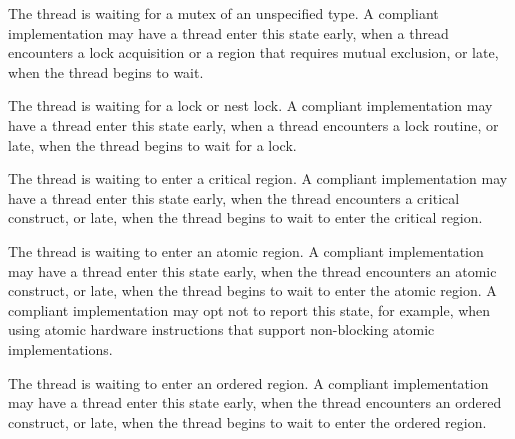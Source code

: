 \documentclass{article}
\newcommand{\descheader}[1]{{\needspace{3\baselineskip}\vspace{1em}\noindent \fbox{#1}}}
\begin{document}
\begin{description}

\item {}

  The thread is waiting for a mutex of an unspecified type. A compliant implementation
  may have a thread enter this state early, when a thread encounters a lock acquisition or a region that requires mutual exclusion, or late, when the thread begins to wait.

\item {}

  The thread is waiting for a  lock  or nest lock. A compliant implementation
  may have a thread enter this state early, when a thread
  encounters a lock  routine, or late, when the thread
  begins to wait for a lock.

\item {} 

  The thread is waiting to enter a critical region. A compliant
  implementation may have a thread enter this state early, when the
  thread encounters a critical construct, or late, when the thread
  begins to wait to enter the critical region. 


\item {} 

  The thread is waiting to enter an atomic region. A compliant
  implementation may have a thread enter this state early, when the thread
  encounters an atomic construct, or late, when the thread begins
  to wait to enter the atomic region. 
  A compliant implementation may opt not to report
  this state, for example, when using atomic hardware instructions that support non-blocking atomic implementations.
  

\item {} 

  The thread is waiting to enter an ordered region. A compliant
  implementation may have a thread enter this state early, when the thread encounters
  an ordered construct, or late, when the thread begins
  to wait to enter the ordered region. 
  
\end{description}
  
\descheader{Target Wait States}
\end{document}
